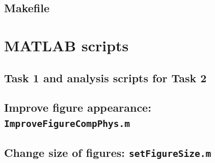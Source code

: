 \subsection{Makefile}


\section{MATLAB scripts}
\subsection{Task 1 and analysis scripts for Task 2}


\subsection{Improve figure appearance: \texttt{ImproveFigureCompPhys.m}}


\subsection{Change size of figures: \texttt{setFigureSize.m}}




